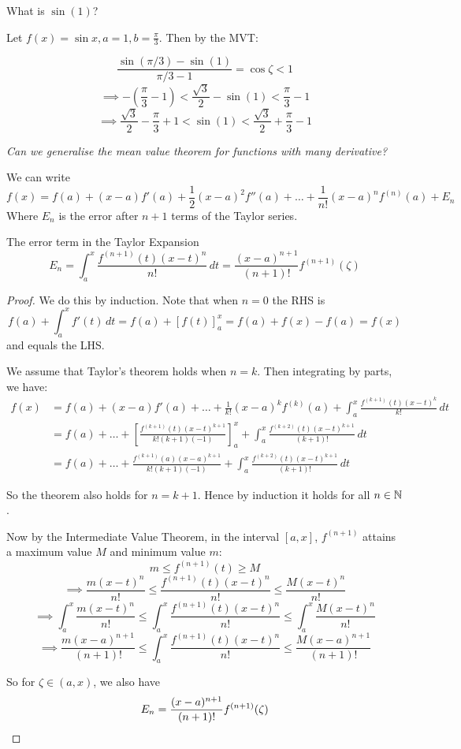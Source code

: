 \documentclass[twoside]{scrartcl}
\begin{document}
\begin{example}
What is $\sin(1)$?

Let $f(x) = \sin x, a = 1, b = \frac{\pi}{3}$. Then by the MVT: 

\[\frac{\sin(\pi/3) - \sin(1)}{\pi/3 -1} = \cos \zeta < 1\]
\[\implies -(\frac{\pi}{3}-1) < \frac{\sqrt{3}}{2} - \sin(1) < \frac{\pi}{3} -1\]
\[\implies \frac{\sqrt{3}}{2} - \frac{\pi}{3} + 1 < \sin(1) < \frac{\sqrt{3}}{2} + \frac{\pi}{3} -1\]	
\end{example}
\pagebreak 

\emph{Can we generalise the mean value theorem for functions with many derivative?} 

We can write
\[f(x) = f(a) + (x-a)f'(a) + \frac{1}{2}(x-a)^2f''(a) +  \dots + \frac{1}{n!}(x-a)^nf^{(n)}(a) + E_n\]
Where $E_n$ is the error after $n+1$ terms of the Taylor series. 

\begin{theorem}
	The error term in the Taylor Expansion
	\[E_n = \int_a^x \frac{f^{(n+1)}(t)(x-t)^n}{n!}\,dt = \frac{(x-a)^{n+1}}{(n+1)!}f^{(n+1)}(\zeta)\]
\end{theorem}

\begin{proof}
We do this by induction. Note that when $n=0$ the RHS is 
\[f(a) + \int_a^x f'(t)\,dt = f(a) + \left[f(t)\right]_a^x = f(a) + f(x) - f(a) = f(x)\]
and equals the LHS.

We assume that Taylor's theorem holds when $n =k$. Then integrating by parts, we have:
\[
\begin{aligned}
  f(x) &= f(a) + (x-a)f'(a) + \dots + \frac{1}{k!}(x-a)^kf^{(k)}(a) + \int_a^x \frac{f^{(k+1)}(t)(x-t)^k}{k!}\,dt\\[0.3cm]
  &= f(a) + \dots + \left[\frac{f^{(k+1)}(t)(x-t)^{k+1}}{k!(k+1)(-1)}\right]_a^x +  \int_a^x \frac{f^{(k+2)}(t)(x-t)^{k+1}}{(k+1)!}\,dt\\[0.3cm]
    &= f(a) + \dots + \frac{f^{(k+1)}(a)(x-a)^{k+1}}{k!(k+1)(-1)} + \int_a^x \frac{f^{(k+2)}(t)(x-t)^{k+1}}{(k+1)!}\,dt
\end{aligned}
\]

So the theorem also holds for $n = k+1$. Hence by induction it holds for all $n \in\mathbb{N}$. 

Now by the Intermediate Value Theorem, in the interval $[a,x]$, $f^{(n+1)}$ attains a maximum value $M$ and minimum value $m$:
\[m \leq f^{(n+1)}(t) \geq M\]\vspace*{5pt}
\[  \implies \frac{m(x-t)^n}{n!} \leq \frac{f^{(n+1)}(t)(x-t)^n}{n!} \leq \frac{M(x-t)^n}{n!}\]\vspace*{5pt}
\[\implies \int_a^x\frac{m(x-t)^n}{n!} \leq \int_a^x\frac{f^{(n+1)}(t)(x-t)^n}{n!} \leq \int_a^x \frac{M(x-t)^n}{n!}\]\vspace*{5pt}
\[\implies \frac{m(x-a)^{n+1}}{(n+1)!} \leq \int_a^x\frac{f^{(n+1)}(t)(x-t)^n}{n!} \leq \frac{M(x-a)^{n+1}}{(n+1)!}\]

So for $\zeta \in (a,x)$, we also have \[E_n = \frac{(x-a)^{n+1}}{(n+1)!}f^{(n+1)}(\zeta)\qedhere\]
\end{proof}
\end{document}
